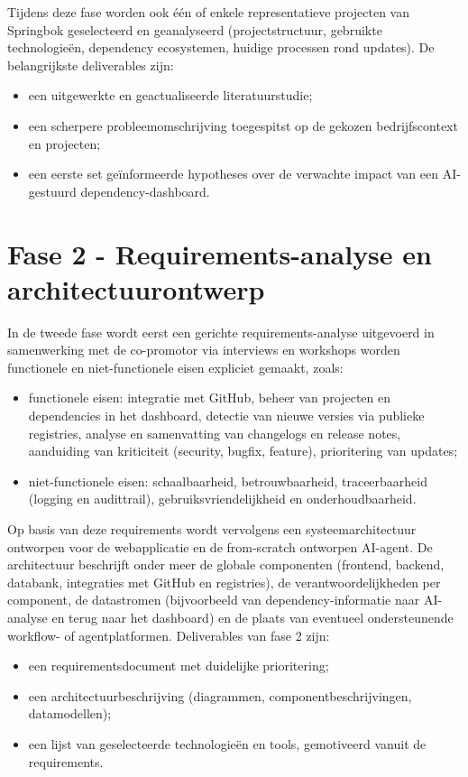 Tijdens deze fase worden ook één of enkele representatieve projecten van Springbok geselecteerd en geanalyseerd (projectstructuur, gebruikte technologieën, dependency ecosystemen, huidige processen rond updates). De belangrijkste deliverables zijn:
\begin{itemize}
    \item een uitgewerkte en geactualiseerde literatuurstudie;
    \item een scherpere probleemomschrijving toegespitst op de gekozen bedrijfscontext en projecten;
    \item een eerste set geïnformeerde hypotheses over de verwachte impact van een AI-gestuurd dependency-dashboard.
\end{itemize}

\section{Fase 2 - Requirements-analyse en architectuurontwerp}
\label{sec:fase2}

In de tweede fase wordt eerst een gerichte requirements-analyse uitgevoerd in samenwerking met de co-promotor via interviews en workshops worden functionele en niet-functionele eisen expliciet gemaakt, zoals:
\begin{itemize}
    \item functionele eisen: integratie met GitHub, beheer van projecten en dependencies in het dashboard, detectie van nieuwe versies via publieke registries, analyse en samenvatting van changelogs en release notes, aanduiding van kriticiteit (security, bugfix, feature), prioritering van updates;
    \item niet-functionele eisen: schaalbaarheid, betrouwbaarheid, traceerbaarheid (logging en audittrail), gebruiksvriendelijkheid en onderhoudbaarheid.
\end{itemize}

Op basis van deze requirements wordt vervolgens een systeemarchitectuur ontworpen voor de webapplicatie en de from-scratch ontworpen AI-agent. De architectuur beschrijft onder meer de globale componenten (frontend, backend, databank, integraties met GitHub en registries), de verantwoordelijkheden per component, de datastromen (bijvoorbeeld van dependency-informatie naar AI-analyse en terug naar het dashboard) en de plaats van eventueel ondersteunende workflow- of agentplatformen. Deliverables van fase 2 zijn:
\begin{itemize}
    \item een requirementsdocument met duidelijke prioritering;
    \item een architectuurbeschrijving (diagrammen, componentbeschrijvingen, datamodellen);
    \item een lijst van geselecteerde technologieën en tools, gemotiveerd vanuit de requirements.
\end{itemize}

